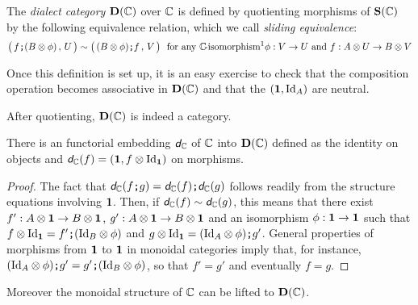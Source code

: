 \begin{definition}
	The \emph{dialect category} $\mathbf D(\mathbb{C})$ over $\mathbb{C}$ is defined by quotienting morphisms of
	$\mathbf S(\mathbb{C})$ by the following equivalence relation, which we call \emph{sliding equivalence}:
		$$\big(\,f\sq(B\monp\phi)\,,\,U\,\big)\eq \big(\,(B\monp\phi)\sq f\,,\,V\,\big) \text{ \ for any 
		$\catf C\!$-isomorphism\footnotemark $\morph\phi VU$ and 
		$\morph f{A\monp U}{B\monp V}$}
		$$
\end{definition}

Once this definition is set up, it is an easy exercise to check that the composition operation
becomes associative in $\mathbf D(\mathbb{C})$ and that the $(\mathbf 1,\mbox{\normalfont Id}_A)$ are neutral.

\begin{proposition}
	After quotienting, $\mathbf D(\mathbb{C})$ is indeed a category.
\end{proposition}

\begin{proposition}
	There is an functorial embedding $\textit{\textsf{d}}_{\mathbb{C}}$ of $\mathbb{C}$ into $\mathbf D(\mathbb{C})$ defined as the identity on
	objects and $\textit{\textsf{d}}_{\mathbb{C}} (f)=(\mathbf 1, f\otimes \mbox{\normalfont Id}_{\mathbf 1})$ on morphisms.
\end{proposition}

\begin{proof}
	The fact that $\textit{\textsf{d}}_{\mathbb{C}}(f\textbf{\tt;} g)=\textit{\textsf{d}}_{\mathbb{C}}(f) \textbf{\tt;} \textit{\textsf{d}}_{\mathbb{C}}(g)$ follows readily from the structure
	equations involving $\mathbf 1$. Then, if $\textit{\textsf{d}}_{\mathbb{C}}(f) \sim \textit{\textsf{d}}_{\mathbb{C}}(g)$, this means that there
	exist $f':A\otimes \mathbf 1\rightarrow B\otimes \mathbf 1$, 
	$g':A\otimes \mathbf 1\rightarrow B\otimes \mathbf 1$ and an isomorphism $\phi:\mathbf 1\rightarrow \mathbf 1$
	such that $f\otimes\mbox{\normalfont Id}_\mathbf 1=f'\textbf{\tt;} (\mbox{\normalfont Id}_B\otimes\phi)$ and 
	$g\otimes\mbox{\normalfont Id}_\mathbf 1=(\mbox{\normalfont Id}_A\otimes\phi)\textbf{\tt;} g'$. General properties of morphisms from $\mathbf 1$ to
	$\mathbf 1$ in monoidal categories imply that, for instance, $(\mbox{\normalfont Id}_A\otimes\phi)\textbf{\tt;} g'=g'\textbf{\tt;} (\mbox{\normalfont Id}_B\otimes\phi)$,
	so that $f'=g'$ and eventually $f=g$.
\end{proof}

Moreover the monoidal structure of $\mathbb{C}$ can be lifted to $\mathbf D(\mathbb{C})$.


